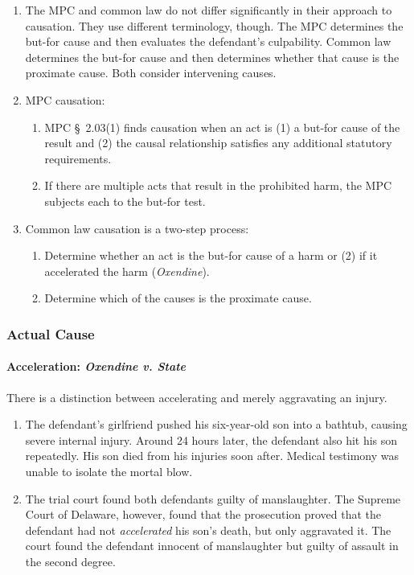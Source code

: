 \begin{enumerate}
    \item The MPC and common law do not differ significantly in their approach 
    to causation. They use different terminology, though. The MPC determines 
    the but-for cause and then evaluates the defendant's culpability. Common 
    law determines the but-for cause and then determines whether that cause is 
    the proximate cause. Both consider intervening causes.
    \item MPC causation:
    \begin{enumerate}
        \item MPC \S\ 2.03(1) finds causation when an act is (1) a but-for 
        cause of the result and (2) the causal relationship satisfies any 
        additional statutory requirements.
        \item If there are multiple acts that result in the prohibited harm, 
        the MPC subjects each to the but-for test.
    \end{enumerate}
    \item Common law causation is a two-step process:
    \begin{enumerate}
        \item Determine whether an act is the but-for cause of a harm or (2) 
        if it accelerated the harm (\emph{Oxendine}).
        \item Determine which of the causes is the proximate cause.
    \end{enumerate}
\end{enumerate}

\subsubsection{Actual Cause}

\paragraph{Acceleration: \emph{Oxendine v. State}}

There is a distinction between accelerating and merely aggravating an injury.

\begin{enumerate}
    \item The defendant's girlfriend pushed his six-year-old son into a 
    bathtub, causing severe internal injury. Around 24 hours later, the 
    defendant also hit his son repeatedly. His son died from his injuries soon 
    after. Medical testimony was unable to isolate the mortal blow.
    \item The trial court found both defendants guilty of manslaughter. The 
    Supreme Court of Delaware, however, found that the prosecution proved that 
    the defendant had not \emph{accelerated} his son's death, but only 
    aggravated it. The court found the defendant innocent of manslaughter but 
    guilty of assault in the second degree.
\end{enumerate}

